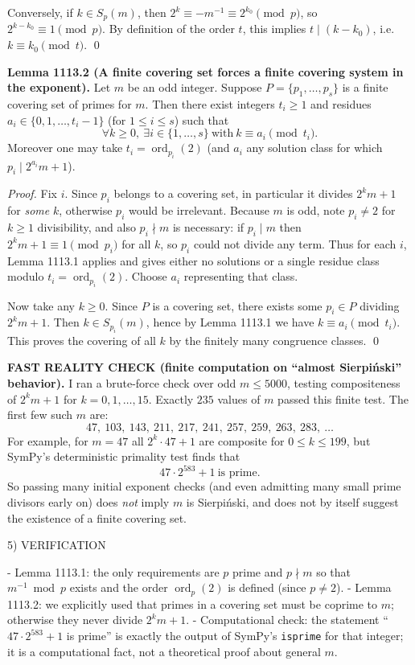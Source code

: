 Conversely, if \(k\in S_p(m)\), then
\(2^k\equiv -m^{-1}\equiv 2^{k_0}\pmod p\), so \(2^{k-k_0}\equiv 1\pmod p\). By definition of the order \(t\), this implies \(t\mid (k-k_0)\), i.e. \(k\equiv k_0\pmod t\). \qed

\textbf{Lemma 1113.2 (A finite covering set forces a finite covering system in the exponent).}
Let \(m\) be an odd integer. Suppose \(P=\{p_1,\dots,p_s\}\) is a finite covering set of primes for \(m\). Then there exist integers \(t_i\ge 1\) and residues \(a_i\in\{0,1,\dots,t_i-1\}\) (for \(1\le i\le s\)) such that
\[
\forall k\ge 0,\ \exists i\in\{1,\dots,s\}\ \text{with}\ k\equiv a_i\pmod{t_i}.
\]
Moreover one may take \(t_i=\operatorname{ord}_{p_i}(2)\) (and \(a_i\) any solution class for which \(p_i\mid 2^{a_i}m+1\)).

\emph{Proof.}
Fix \(i\). Since \(p_i\) belongs to a covering set, in particular it divides \(2^{k}m+1\) for \emph{some} \(k\), otherwise \(p_i\) would be irrelevant. Because \(m\) is odd, note \(p_i\ne 2\) for \(k\ge 1\) divisibility, and also \(p_i\nmid m\) is necessary: if \(p_i\mid m\) then \(2^k m+1\equiv 1\pmod{p_i}\) for all \(k\), so \(p_i\) could not divide any term.
Thus for each \(i\), Lemma 1113.1 applies and gives either no solutions or a single residue class modulo \(t_i=\operatorname{ord}_{p_i}(2)\). Choose \(a_i\) representing that class.

Now take any \(k\ge 0\). Since \(P\) is a covering set, there exists some \(p_i\in P\) dividing \(2^k m+1\). Then \(k\in S_{p_i}(m)\), hence by Lemma 1113.1 we have \(k\equiv a_i\pmod{t_i}\). This proves the covering of all \(k\) by the finitely many congruence classes. \qed

\textbf{FAST REALITY CHECK (finite computation on ``almost Sierpi\'nski'' behavior).}
I ran a brute-force check over odd \(m\le 5000\), testing compositeness of \(2^k m+1\) for \(k=0,1,\dots,15\). Exactly \(235\) values of \(m\) passed this finite test.
The first few such \(m\) are:
\[
47,\ 103,\ 143,\ 211,\ 217,\ 241,\ 257,\ 259,\ 263,\ 283,\ \dots
\]
For example, for \(m=47\) all \(2^k\cdot 47+1\) are composite for \(0\le k\le 199\), but SymPy's deterministic primality test finds that
\[
47\cdot 2^{583}+1\ \text{is prime}.
\]
So passing many initial exponent checks (and even admitting many small prime divisors early on) does \emph{not} imply \(m\) is Sierpi\'nski, and does not by itself suggest the existence of a finite covering set.

5) VERIFICATION

- Lemma 1113.1: the only requirements are \(p\) prime and \(p\nmid m\) so that \(m^{-1}\bmod p\) exists and the order \(\operatorname{ord}_p(2)\) is defined (since \(p\ne 2\)).
- Lemma 1113.2: we explicitly used that primes in a covering set must be coprime to \(m\); otherwise they never divide \(2^k m+1\).
- Computational check: the statement ``\(47\cdot 2^{583}+1\) is prime'' is exactly the output of SymPy's \texttt{isprime} for that integer; it is a computational fact, not a theoretical proof about general \(m\).


